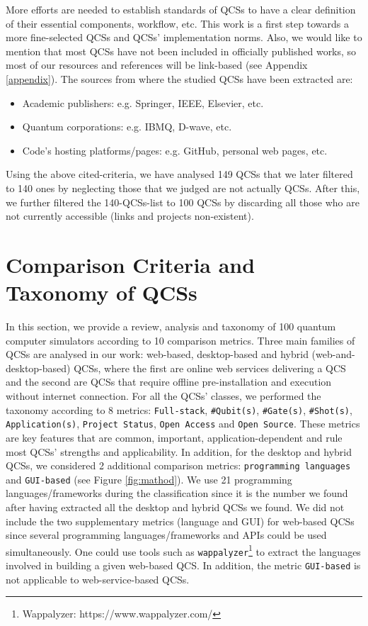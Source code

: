 \documentclass[conference]{IEEEtran}
\begin{document}
More efforts are needed to establish standards of QCSs to have a clear definition of their essential components, workflow, etc. This work is a first step towards a more fine-selected QCSs and QCSs' implementation norms. Also, we would like to mention that most QCSs have not been included in officially published works, so most of our resources and references will be link-based (see Appendix \ref{appendix}). The sources from where the studied QCSs have been extracted are:

\begin{itemize}
	\item Academic publishers: e.g. Springer, IEEE, Elsevier, etc.
	\item Quantum corporations: e.g. IBMQ, D-wave, etc.
	\item Code's hosting platforms/pages: e.g. GitHub, personal web pages, etc.
\end{itemize} 


Using the above cited-criteria, we have analysed 149 QCSs that we later filtered to 140 ones by neglecting those that we judged are not actually QCSs. After this, we further filtered the 140-QCSs-list to 100 QCSs by discarding all those who are not currently accessible (links and projects non-existent).

\section{Comparison Criteria and Taxonomy of QCSs \label{sec:TQCS}}
In this section, we provide a review, analysis and taxonomy of 100 quantum computer simulators according to 10 comparison metrics. Three main families of QCSs are analysed in our work: web-based, desktop-based and hybrid (web-and-desktop-based) QCSs, where the first are online web services delivering a QCS and the second are QCSs that require offline pre-installation and execution without internet connection. For all the QCSs' classes, we performed the taxonomy according to 8 metrics: \texttt{Full-stack}, \texttt{\#Qubit(s)}, \texttt{\#Gate(s)}, \texttt{\#Shot(s)}, \texttt{Application(s)}, \texttt{Project Status}, \texttt{Open Access} and \texttt{Open Source}. These metrics are key features that are common, important, application-dependent and rule most QCSs' strengths and applicability. In addition, for the desktop and hybrid QCSs, we considered 2 additional comparison metrics: \texttt{programming languages} and \texttt{GUI-based} (see Figure \ref{fig:mathod}). We use 21 programming languages/frameworks during the classification since it is the number we found after having extracted all the desktop and hybrid QCSs we found. We did not include the two supplementary metrics (language and GUI) for web-based QCSs since several programming languages/frameworks and APIs could be used simultaneously. One could use tools such as \texttt{wappalyzer}\footnote{Wappalyzer: https://www.wappalyzer.com/} to extract the languages involved in building a given web-based QCS. In addition, the metric \texttt{GUI-based} is not applicable to web-service-based QCSs. 
\end{document}
